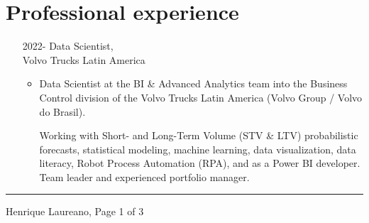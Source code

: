 \documentclass[12pt]{article}
\newcommand{\horrule}[1]{\noindent\rule{\linewidth}{#1}}
\begin{document}
\vspace{-0.5cm}
\section*{Professional experience}

\begin{itemize}
 \item[2022-] Data Scientist,\\
              Volvo Trucks Latin America
  \begin{itemize}
  \item Data Scientist at the BI \& Advanced Analytics team into the
        Business Control division of the Volvo Trucks Latin America (Volvo Group
        / Volvo do Brasil).

        Working with Short- and Long-Term Volume (STV \& LTV) probabilistic
        forecasts, statistical modeling, machine learning, data visualization, 
        data literacy, Robot Process Automation (RPA), and as a Power BI 
        developer. Team leader and experienced portfolio manager.
  \end{itemize}
\end{itemize}

\vspace{\fill}
\horrule{1pt}
\noindent Henrique Laureano, \hfill Page 1 of 3
\end{document}
